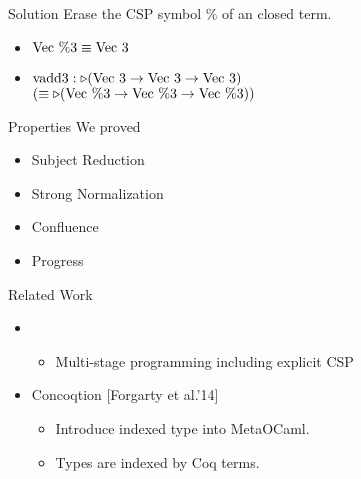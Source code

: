 \documentclass[dvipdfmx,aspectratio=169, 20pt]{beamer}
\begin{document}
\begin{frame}[fragile]{Solution}
    \newcommand{\Vt}{\text{Vec}\ 3}
    \newcommand{\Vpt}{\text{Vec}\ \%3}
    Erase the CSP symbol \( \% \) of an closed term.
    \begin{center}
    \end{center}
    \begin{itemize}
        \item \( \text{Vec}\ \%3 \equiv \text{Vec}\ 3 \)
        \item \( \text{vadd3} : \TW (\Vt \to \Vt \to \Vt) \) \\
            \hspace{15mm} \( (\E  \TW (\Vpt \to \Vpt \to \Vpt)) \)
    \end{itemize}
\end{frame}

\begin{frame}[fragile]{Properties}
    We proved
    \begin{itemize}
        \item Subject Reduction
        \item Strong Normalization
        \item Confluence
        \item Progress
    \end{itemize}
    \note{
    }
\end{frame}

\begin{frame}[fragile]{Related Work}
    \begin{itemize}
        \item {}
            \begin{itemize}
                \item Multi-stage programming including explicit CSP
            \end{itemize}
        \item Concoqtion [Forgarty et al.'14]
            \begin{itemize}
                \item Introduce indexed type into MetaOCaml.
                \item Types are indexed by Coq terms.
            \end{itemize}
    \end{itemize}
    \note{
    }
\end{frame}
\end{document}
